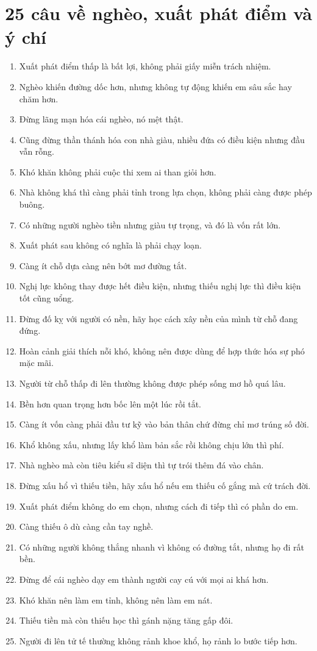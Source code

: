 \section{25 câu về nghèo, xuất phát điểm và ý chí}
\begin{enumerate}[leftmargin=*,resume]
\item Xuất phát điểm thấp là bất lợi, không phải giấy miễn trách nhiệm.
\item Nghèo khiến đường dốc hơn, nhưng không tự động khiến em sâu sắc hay chăm hơn.
\item Đừng lãng mạn hóa cái nghèo, nó mệt thật.
\item Cũng đừng thần thánh hóa con nhà giàu, nhiều đứa có điều kiện nhưng đầu vẫn rỗng.
\item Khó khăn không phải cuộc thi xem ai than giỏi hơn.
\item Nhà không khá thì càng phải tỉnh trong lựa chọn, không phải càng được phép buông.
\item Có những người nghèo tiền nhưng giàu tự trọng, và đó là vốn rất lớn.
\item Xuất phát sau không có nghĩa là phải chạy loạn.
\item Càng ít chỗ dựa càng nên bớt mơ đường tắt.
\item Nghị lực không thay được hết điều kiện, nhưng thiếu nghị lực thì điều kiện tốt cũng uổng.
\item Đừng đố kỵ với người có nền, hãy học cách xây nền của mình từ chỗ đang đứng.
\item Hoàn cảnh giải thích nỗi khó, không nên được dùng để hợp thức hóa sự phó mặc mãi.
\item Người từ chỗ thấp đi lên thường không được phép sống mơ hồ quá lâu.
\item Bền hơn quan trọng hơn bốc lên một lúc rồi tắt.
\item Càng ít vốn càng phải đầu tư kỹ vào bản thân chứ đừng chỉ mơ trúng số đời.
\item Khổ không xấu, nhưng lấy khổ làm bản sắc rồi không chịu lớn thì phí.
\item Nhà nghèo mà còn tiêu kiểu sĩ diện thì tự trói thêm đá vào chân.
\item Đừng xấu hổ vì thiếu tiền, hãy xấu hổ nếu em thiếu cố gắng mà cứ trách đời.
\item Xuất phát điểm không do em chọn, nhưng cách đi tiếp thì có phần do em.
\item Càng thiếu ô dù càng cần tay nghề.
\item Có những người không thắng nhanh vì không có đường tắt, nhưng họ đi rất bền.
\item Đừng để cái nghèo dạy em thành người cay cú với mọi ai khá hơn.
\item Khó khăn nên làm em tỉnh, không nên làm em nát.
\item Thiếu tiền mà còn thiếu học thì gánh nặng tăng gấp đôi.
\item Người đi lên tử tế thường không rảnh khoe khổ, họ rảnh lo bước tiếp hơn.
\end{enumerate}

